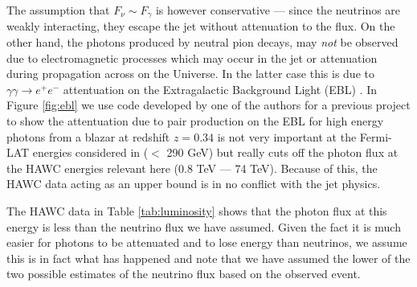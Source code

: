 The assumption that $F_\nu \sim F_\gamma$ is however conservative --- since the neutrinos are weakly interacting, they escape the jet without attenuation to the flux. On the other hand, the photons produced by neutral pion decays, may \textit{not} be observed due to electromagnetic processes which may occur in the jet or attenuation during propagation across on the Universe. In the latter case this is due to $\gamma\gamma \rightarrow e^+ e^-$ attentuation on the Extragalactic Background Light (EBL) \cite{Finke:2009xi}.  In Figure \ref{fig:ebl} we use code developed by one of the authors for a previous project \cite{DeLavallaz:2011ju} to show the attentuation due to pair production on the EBL for high energy photons from a blazar at redshift $z=0.34$ is not very important at the Fermi-LAT energies considered in \cite{Kelly} ($<$ 290 GeV) but really cuts off the photon flux at the HAWC energies relevant here (0.8 TeV --- 74 TeV). Because of this, the HAWC data acting as an upper bound is in no conflict with the jet physics.

The HAWC data in Table \ref{tab:luminosity} shows that the photon flux at this energy is less than the neutrino flux we have assumed.  Given the fact it is much easier for photons to be attenuated and to lose energy than neutrinos, we assume this is in fact what has happened and note that we have assumed the lower of the two possible estimates of the neutrino flux based on the observed event.